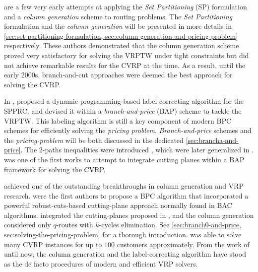 \Textcite{desrosiers1984, agarwal1989setpartitioningbased}
are a few very early attempts at applying the \textit{Set Partitioning} (SP) formulation
and a \textit{column generation} scheme to routing problems.
The \textit{Set Partitioning} formulation and the \textit{column generation}
will be  presented in more details in \cref{sec:set-partitioning-formulation, sec:column-generation-and-pricing-problem}
respectively.
These authors demonstrated that the column generation scheme proved very satisfactory
for solving the VRPTW under tight constraints
but did not achieve remarkable results for the CVRP at the time.
As a result, until the early 2000s,
branch-and-cut approaches were deemed the best approach for solving the CVRP.

In \citeyear{desrochers1992}, \citeauthor{desrochers1992}
proposed a dynamic programming-based label-correcting algorithm for the SPPRC,
and devised it within a \textit{branch-and-price} (BAP) scheme to tackle the VRPTW.
This labeling algorithm is still a key component of modern BPC schemes
for efficiently solving the \textit{pricing problem}.
\textit{Branch-and-price} schemes and the \textit{pricing-problem}
will be both discussed in the dedicated \cref{sec:brancha-and-price}.
The 2-paths inequalities were introduced \textcite{kohl1999},
which were later generalized in \textcite{desaulniers2008}.
\Textcite{kohl1999} was one of the first works to attempt
to integrate cutting planes within a BAP framework for solving the CVRP.

\Textcite{fukasawa2006} achieved one of the outstanding breakthroughs in column generation and VRP research.
 were the first authors to propose a BPC algorithm
that incorporated a powerful robust-cuts-based cutting-plane approach normally found in BAC algorithms.
\citeauthor{fukasawa2006} integrated the cutting-planes proposed in \cite{lysgaard2004},
and the column generation considered only $q$-routes with $k$-cycles elimination.
See \cref{sec:branch0-and-price, sec:solving-the-pricing-problem} for a thorough introduction.
\textcite{fukasawa2006} was able to solve many CVRP instances for up to $100$ customers approximately.
From the work of \citeauthor{fukasawa2006} until now,
the column generation and the label-correcting algorithm
have stood as the de facto procedures of modern and efficient VRP solvers.

